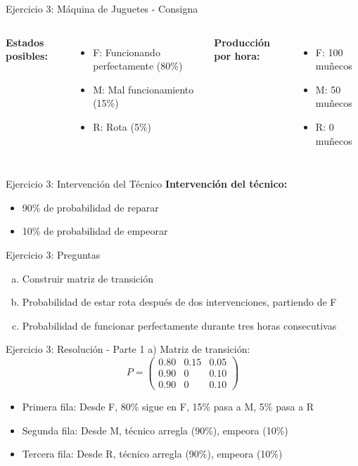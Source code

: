 \documentclass{beamer}
\begin{document}
\begin{frame}{Ejercicio 3: Máquina de Juguetes - Consigna}
    \begin{columns}[T]
        \textbf{Estados posibles:}
        \begin{itemize}
            \item F: Funcionando perfectamente (80\%)
            \item M: Mal funcionamiento (15\%)
            \item R: Rota (5\%)
        \end{itemize}
        
        \textbf{Producción por hora:}
        \begin{itemize}
            \item F: 100 muñecos
            \item M: 50 muñecos
            \item R: 0 muñecos
        \end{itemize}
    \end{columns}
\end{frame}

\begin{frame}{Ejercicio 3: Intervención del Técnico}
    \textbf{Intervención del técnico:}
    \begin{itemize}
        \item 90\% de probabilidad de reparar
        \item 10\% de probabilidad de empeorar
    \end{itemize}
\end{frame}

\begin{frame}{Ejercicio 3: Preguntas}
    \begin{enumerate}[a)]
        \item Construir matriz de transición
        \item Probabilidad de estar rota después de dos intervenciones, partiendo de F
        \item Probabilidad de funcionar perfectamente durante tres horas consecutivas
    \end{enumerate}
\end{frame}

\begin{frame}{Ejercicio 3: Resolución - Parte 1}
    a) Matriz de transición:
    \[P = \begin{pmatrix}
    0.80 & 0.15 & 0.05 \\
    0.90 & 0 & 0.10 \\
    0.90 & 0 & 0.10
    \end{pmatrix}\]
    
    \begin{itemize}
        \item Primera fila: Desde F, 80\% sigue en F, 15\% pasa a M, 5\% pasa a R
        \item Segunda fila: Desde M, técnico arregla (90\%), empeora (10\%)
        \item Tercera fila: Desde R, técnico arregla (90\%), empeora (10\%)
    \end{itemize}
\end{frame}
\end{document}
